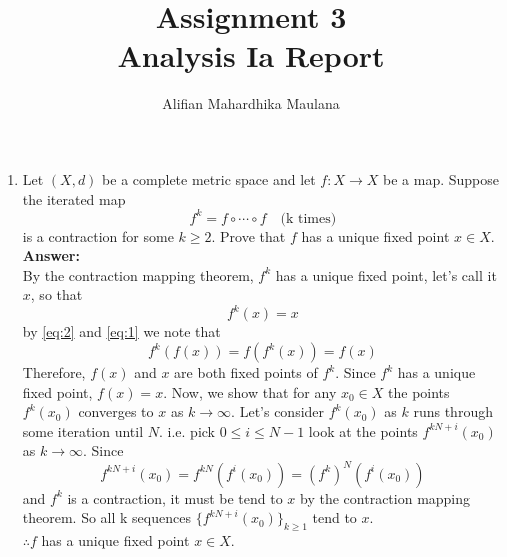 \documentclass[a4paper,12pt]{article}
\title{Assignment 3 \\ Analysis Ia Report}
\author{Alifian Mahardhika Maulana}
\begin{document}
\maketitle
\begin{enumerate}
	\item Let $(X,d)$ be a complete metric space and let $f:X \to X$ be a map. Suppose the iterated map
	\begin{equation}\label{eq:1}
	f^k = f \circ \cdots \circ f \quad \text{(k times)}
	\end{equation}
	is a contraction for some $k\geq 2$. Prove that $f$ has a unique fixed point $x \in X$.\\
	\newline
	\textbf{Answer:}\\
	By the contraction mapping theorem, $f^k$ has a unique fixed point, let's call it $x$, so that
	\begin{equation}\label{eq:2}
	f^k(x) = x
	\end{equation}
	by \eqref{eq:2} and \eqref{eq:1} we note that $$f^k(f(x)) = f(f^k(x)) = f(x)$$
	Therefore, $f(x)$ and $x$ are both fixed points of $f^k$. Since $f^k$ has a unique fixed point, $f(x) = x$. Now, we show that for any $x_0 \in X$ the points $f^k(x_0)$ converges to $x$ as $k\to \infty$. Let's consider $f^k(x_0)$ as $k$ runs through some iteration until $N$. i.e. pick $0 \leq i \leq N-1$ look at the points $f^{kN+i}(x_0)$ as $k\to\infty$. Since
	$$f^{kN+i}(x_0) = f^{kN}(f^i(x_0)) = (f^k)^N(f^i(x_0))$$
	and $f^k$ is a contraction, it must be tend to $x$ by the contraction mapping theorem. So all k sequences $\{f^{kN+i}(x_0)\}_{k\geq 1}$ tend to $x$.\\
	$\therefore f$ has a unique fixed point $x \in X$.
\end{enumerate}
\end{document}
